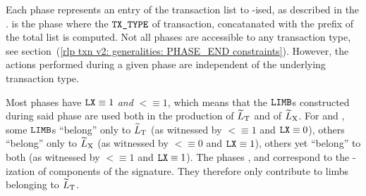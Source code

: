 Each phase represents an entry of the transaction list to \rlp{}-ised, as described in the \cite{EYP-London}.
\phaseRlpPrefix{} is the phase where the $\texttt{TX\_TYPE}$ of transaction,
concatanated with the \rlp{} prefix of the total list is computed.
Not all phases are accessible to any transaction type,
see section~(\ref{rlp txn v2: generalities: PHASE_END constraints}).
However, the actions performed during a given phase are independent of the underlying transaction type.

Most phases have $\texttt{LX} \equiv 1$ \emph{and} $\lt \equiv 1$,
which means that the $\texttt{LIMB}$s constructed during said phase
are used both in the production of
$\widetilde{L}_{\mathrm{T}}$ and of
$\widetilde{L}_{\mathrm{X}}$.
For \phaseRlpPrefix{} and \phaseBeta{},
some $\texttt{LIMB}$s ``belong'' only to $\widetilde{L}_{\mathrm{T}}$ (as witnessed by $\lt \equiv 1$ and $\texttt{LX} \equiv 0$),
others        ``belong'' only to $\widetilde{L}_{\mathrm{X}}$ (as witnessed by $\lt \equiv 0$ and $\texttt{LX} \equiv 1$),
others yet    ``belong'' to both               (as witnessed by $\lt \equiv 1$ and $\texttt{LX} \equiv 1$).
The phases \phaseY{}, \phaseR{} and \phaseS{} correspond to the \rlp{}-ization of components of the signature.
They therefore only contribute to limbs belonging to $\widetilde{L}_{\mathrm{T}}$.

